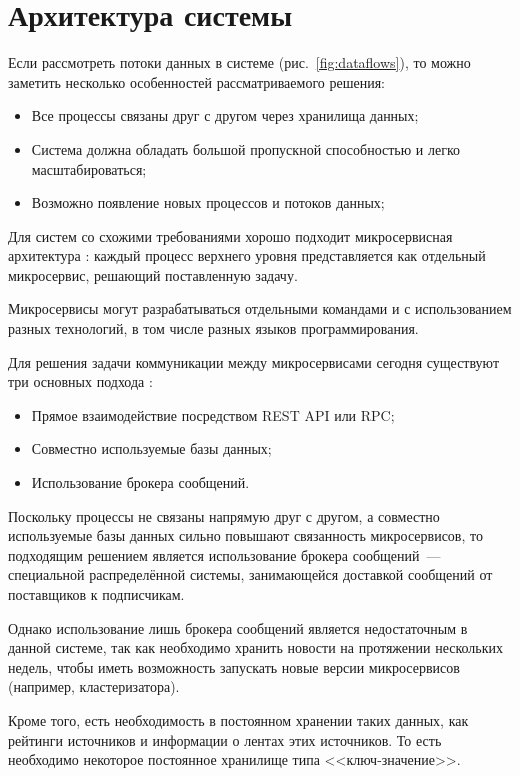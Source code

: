 \section{Архитектура системы}
Если рассмотреть потоки данных в системе (рис.~\ref{fig:dataflows}), то можно заметить несколько особенностей рассматриваемого решения:
\begin{itemize}
    \item Все процессы связаны друг с другом через хранилища данных;
    \item Система должна обладать большой пропускной способностью и легко масштабироваться;
    \item Возможно появление новых процессов и потоков данных;
\end{itemize}

Для систем со схожими требованиями хорошо подходит микросервисная архитектура \cite{kleppmann17}: каждый процесс верхнего уровня представляется как отдельный микросервис, решающий поставленную задачу.

Микросервисы могут разрабатываться отдельными командами и с использованием разных технологий, в том числе разных языков программирования.

Для решения задачи коммуникации между микросервисами сегодня существуют три основных подхода \cite{neuman15}:
\begin{itemize}
    \item Прямое взаимодействие посредством REST API или RPC;
    \item Совместно используемые базы данных;
    \item Использование брокера сообщений.
\end{itemize}

Поскольку процессы не связаны напрямую друг с другом, а совместно используемые базы данных сильно повышают связанность микросервисов, то подходящим решением является использование брокера сообщений~--- специальной распределённой системы, занимающейся доставкой сообщений от поставщиков к подписчикам.

Однако использование лишь брокера сообщений является недостаточным в данной системе, так как необходимо хранить новости на протяжении нескольких недель, чтобы иметь возможность запускать новые версии микросервисов (например, кластеризатора).

Кроме того, есть необходимость в постоянном хранении таких данных, как рейтинги источников и информации о лентах этих источников. То есть необходимо некоторое постоянное хранилище типа <<ключ-значение>>.

